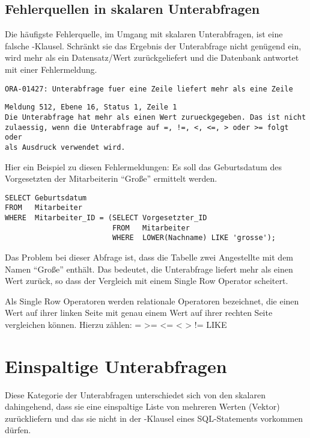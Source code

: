 \subsection{Fehlerquellen in skalaren Unterabfragen}
Die häufigste Fehlerquelle, im Umgang mit skalaren Unterabfragen, ist eine falsche \WHERE-Klausel. Schränkt sie das Ergebnis der Unterabfrage nicht genügend ein, wird mehr als ein Datensatz/Wert zurückgeliefert und die Datenbank antwortet mit einer Fehlermeldung.
\begin{lstlisting}[language=oracle_sql,caption={Mehr als eine Zeile: Fehlermeldung in Oracle},label=sql06_04]
ORA-01427: Unterabfrage fuer eine Zeile liefert mehr als eine Zeile
          \end{lstlisting}
\begin{lstlisting}[language=ms_sql,caption={Mehr als eine Zeile: Fehlermeldung in SQL Server},label=sql06_05]
Meldung 512, Ebene 16, Status 1, Zeile 1
Die Unterabfrage hat mehr als einen Wert zurueckgegeben. Das ist nicht
zulaessig, wenn die Unterabfrage auf =, !=, <, <=, > oder >= folgt oder
als Ausdruck verwendet wird.
          \end{lstlisting}
		  \clearpage
Hier ein Beispiel zu diesen Fehlermeldungen: Es soll das Geburtsdatum des Vorgesetzten der Mitarbeiterin \enquote{Große} ermittelt werden.
\begin{lstlisting}[language=oracle_sql,caption={Eine Single Row Unterabfrage mit Problemen!},label=sql06_06]
SELECT Geburtsdatum
FROM   Mitarbeiter
WHERE  Mitarbeiter_ID = (SELECT Vorgesetzter_ID
                         FROM   Mitarbeiter
                         WHERE  LOWER(Nachname) LIKE 'grosse');
          \end{lstlisting}
Das Problem bei dieser Abfrage ist, dass die Tabelle  zwei Angestellte mit dem Namen \enquote{Große} enthält. Das bedeutet, die Unterabfrage liefert mehr als einen Wert zurück, so dass der Vergleich mit einem Single Row Operator scheitert.

\begin{merke}
    Als Single Row Operatoren werden relationale Operatoren bezeichnet, die einen Wert auf ihrer linken Seite mit genau einem Wert auf ihrer rechten Seite vergleichen können. Hierzu zählen: = >= <= < > != LIKE
\end{merke}
\clearpage
\section{Einspaltige Unterabfragen}
Diese Kategorie der Unterabfragen unterschiedet sich von den skalaren dahingehend, dass sie eine einspaltige Liste von mehreren Werten (Vektor) zurückliefern und das sie nicht in der \SELECT-Klausel eines SQL-Statements vorkommen dürfen.

